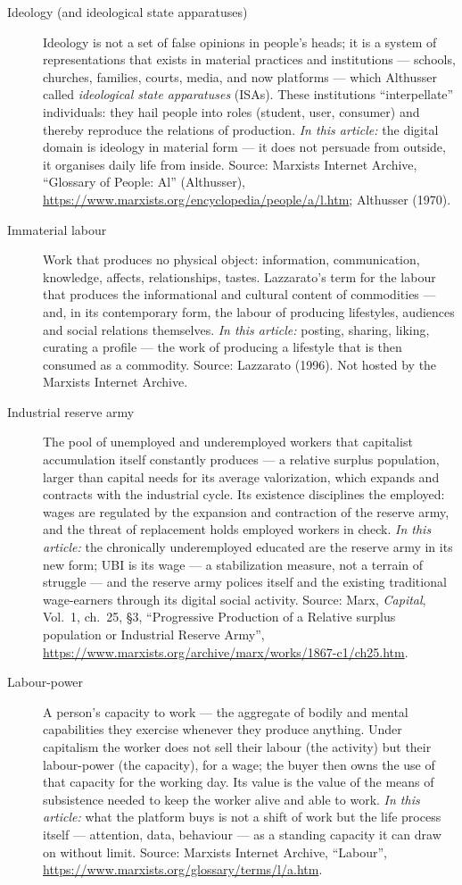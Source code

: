 \documentclass[11pt]{article}
\begin{document}
\begin{description}
\item[Ideology (and ideological state apparatuses)] Ideology is not a
set of false opinions in people's heads; it is a system of
representations that exists in material practices and institutions ---
schools, churches, families, courts, media, and now platforms --- which
Althusser called \emph{ideological state apparatuses} (ISAs). These
institutions ``interpellate'' individuals: they hail people into roles
(student, user, consumer) and thereby reproduce the relations of
production. \emph{In this article:} the digital domain is ideology in
material form --- it does not persuade from outside, it organises
daily life from inside. Source: Marxists Internet Archive, ``Glossary
of People: Al'' (Althusser),
\url{https://www.marxists.org/encyclopedia/people/a/l.htm};
Althusser (1970).

\item[Immaterial labour] Work that produces no physical object:
information, communication, knowledge, affects, relationships, tastes.
Lazzarato's term for the labour that produces the informational and
cultural content of commodities --- and, in its contemporary form, the
labour of producing lifestyles, audiences and social relations
themselves. \emph{In this article:} posting, sharing, liking, curating
a profile --- the work of producing a lifestyle that is then consumed
as a commodity. Source: Lazzarato (1996). Not hosted by the Marxists
Internet Archive.

\item[Industrial reserve army] The pool of unemployed and underemployed
workers that capitalist accumulation itself constantly produces --- a
relative surplus population, larger than capital needs for its average
valorization, which expands and contracts with the industrial cycle.
Its existence disciplines the employed: wages are regulated by the
expansion and contraction of the reserve army, and the threat of
replacement holds employed workers in check. \emph{In this article:}
the chronically underemployed educated are the reserve army in its new
form; UBI is its wage --- a stabilization measure, not a terrain of
struggle --- and the reserve army polices itself and the existing
traditional wage-earners through its digital social activity. Source:
Marx, \emph{Capital}, Vol.~1, ch.~25, \S3, ``Progressive Production of
a Relative surplus population or Industrial Reserve Army'',
\url{https://www.marxists.org/archive/marx/works/1867-c1/ch25.htm}.

\item[Labour-power] A person's capacity to work --- the aggregate of
bodily and mental capabilities they exercise whenever they produce
anything. Under capitalism the worker does not sell their labour (the
activity) but their labour-power (the capacity), for a wage; the buyer
then owns the use of that capacity for the working day. Its value is
the value of the means of subsistence needed to keep the worker alive
and able to work. \emph{In this article:} what the platform buys is
not a shift of work but the life process itself --- attention, data,
behaviour --- as a standing capacity it can draw on without limit.
Source: Marxists Internet Archive, ``Labour'',
\url{https://www.marxists.org/glossary/terms/l/a.htm}.


\end{description}
\end{document}
